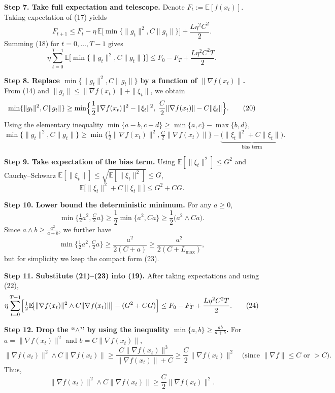 \documentclass{article}
\newcommand{\E}{\mathbb{E}}
\begin{document}
\noindent\textbf{Step 7. Take full expectation and telescope.}  
Denote $F_{t}:=\E[f(x_{t})]$. Taking expectation of (17) yields
\[
F_{t+1}\le F_{t}
          -\eta\,\E\!\bigl[\min\{\|g_{t}\|^{2},C\|g_{t}\|\}\bigr]
          +\frac{L\eta^{2}C^{2}}{2}.
\tag{18}
\]
Summing (18) for $t=0,\dots,T-1$ gives
\[
\eta\sum_{t=0}^{T-1}\E\!\bigl[\min\{\|g_{t}\|^{2},C\|g_{t}\|\}\bigr]
\le F_{0}-F_{T}+ \frac{L\eta^{2}C^{2}T}{2}.
\tag{19}
\]

\noindent\textbf{Step 8. Replace $\min\{\|g_{t}\|^{2},C\|g_{t}\|\}$ by a function of $\|\nabla f(x_{t})\|$.}  
From (14) and $\|g_{t}\|\le \|\nabla f(x_{t})\|+\|\xi_{t}\|$, we obtain
\[
\min\{\|g_{t}\|^{2},C\|g_{t}\|\}
\ge \min\Bigl\{ \frac{1}{2}\|\nabla f(x_{t})\|^{2}
               -\|\xi_{t}\|^{2},
               \;
               \frac{C}{2}\|\nabla f(x_{t})\|
               - C\|\xi_{t}\|
         \Bigr\}.
\tag{20}
\]
Using the elementary inequality $\min\{a-b,c-d\}\ge \min\{a,c\}-\max\{b,d\}$,
\[
\min\{\|g_{t}\|^{2},C\|g_{t}\|\}
\ge \min\!\bigl\{\tfrac{1}{2}\|\nabla f(x_{t})\|^{2},
               \tfrac{C}{2}\|\nabla f(x_{t})\|\bigr\}
   -\underbrace{\bigl(\|\xi_{t}\|^{2}+C\|\xi_{t}\|\bigr)}_{\text{bias term}}.
\tag{21}
\]

\noindent\textbf{Step 9. Take expectation of the bias term.}  
Using $\E[\|\xi_{t}\|^{2}]\le G^{2}$ and Cauchy–Schwarz $\E[\|\xi_{t}\|]\le \sqrt{\E[\|\xi_{t}\|^{2}]}\le G$,
\[
\E\!\bigl[\|\xi_{t}\|^{2}+C\|\xi_{t}\|\bigr]\le G^{2}+CG.
\tag{22}
\]

\noindent\textbf{Step 10. Lower bound the deterministic minimum.}  
For any $a\ge0$,
\[
\min\!\bigl\{\tfrac{1}{2}a^{2},\tfrac{C}{2}a\bigr\}
\ge \frac{1}{2}\min\{a^{2},Ca\}
\ge \frac{1}{2}\bigl(a^{2}\wedge Ca\bigr).
\tag{23}
\]
Since $a\wedge b\ge \frac{a^{2}}{a+b}$, we further have
\[
\min\!\bigl\{\tfrac{1}{2}a^{2},\tfrac{C}{2}a\bigr\}
\ge \frac{a^{2}}{2(C+a)}\ge \frac{a^{2}}{2(C+L_{\max})},
\]
but for simplicity we keep the compact form (23).

\noindent\textbf{Step 11. Substitute (21)–(23) into (19).}  
After taking expectations and using (22),
\[
\eta\sum_{t=0}^{T-1}\Bigl[\tfrac{1}{2}\E\!\bigl[\|\nabla f(x_{t})\|^{2}\wedge C\|\nabla f(x_{t})\|\bigr]
      - (G^{2}+CG)\Bigr]
\le F_{0}-F_{T}+ \frac{L\eta^{2}C^{2}T}{2}.
\tag{24}
\]

\noindent\textbf{Step 12. Drop the “$\wedge$’’ by using the inequality $\min\{a,b\}\ge \frac{ab}{a+b}$.}  
For $a=\|\nabla f(x_{t})\|^{2}$ and $b=C\|\nabla f(x_{t})\|$,
\[
\|\nabla f(x_{t})\|^{2}\wedge C\|\nabla f(x_{t})\|
\ge \frac{C\|\nabla f(x_{t})\|^{3}}{\|\nabla f(x_{t})\|+C}
\ge \frac{C}{2}\|\nabla f(x_{t})\|^{2}\quad\text{(since }\|\nabla f\|\le C\text{ or }>\!C\text{)}.
\]
Thus,
\[
\|\nabla f(x_{t})\|^{2}\wedge C\|\nabla f(x_{t})\|
\ge \frac{C}{2}\|\nabla f(x_{t})\|^{2}.
\tag{25}
\]
\end{document}
